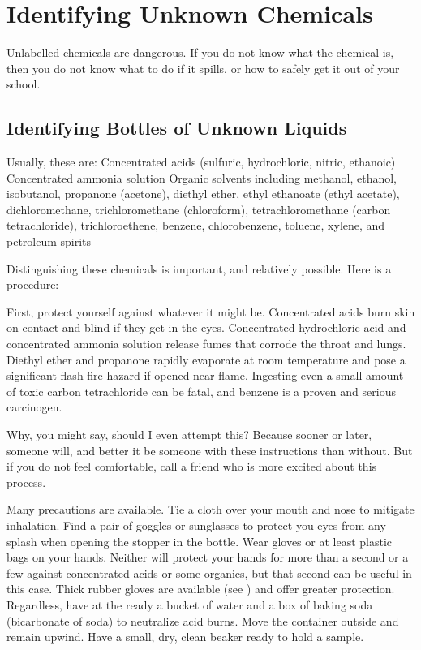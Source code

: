 \chapter{Identifying Unknown Chemicals}
\label{cha:unknownchemicals}
Unlabelled chemicals are dangerous. 
If you do not know what the chemical is, 
then you do not know what to do if it spills, 
or how to safely get it out of your school.

\section{Identifying Bottles of Unknown Liquids}

Usually, 
these are:
Concentrated acids (sulfuric, 
hydrochloric, 
nitric, 
ethanoic)
Concentrated ammonia solution
Organic solvents including methanol, 
ethanol, 
isobutanol, 
propanone (acetone), 
diethyl ether, 
ethyl ethanoate (ethyl acetate), 
dichloromethane, 
trichloromethane (chloroform), 
tetrachloromethane (carbon tetrachloride), 
trichloroethene, 
benzene, 
chlorobenzene, 
toluene, 
xylene, 
and petroleum spirits

Distinguishing these chemicals is important, 
and relatively possible. 
Here is a procedure:

First, 
protect yourself against whatever it might be. 
Concentrated acids burn skin on contact and blind if they get in the eyes. 
Concentrated hydrochloric acid and concentrated ammonia solution 
release fumes that corrode the throat and lungs. 
Diethyl ether and propanone rapidly evaporate at room temperature 
and pose a significant flash fire hazard if opened near flame. 
Ingesting even a small amount of toxic carbon tetrachloride can be fatal, 
and benzene is a proven and serious carcinogen.

Why, 
you might say, 
should I even attempt this? Because sooner or later, 
someone will, 
and better it be someone with these instructions than without. 
But if you do not feel comfortable, 
call a friend who is more excited about this process.

Many precautions are available. 
Tie a cloth over your mouth and nose to mitigate inhalation. 
Find a pair of goggles or sunglasses to protect you eyes 
from any splash when opening the stopper in the bottle. 
Wear gloves or at least plastic bags on your hands. 
Neither will protect your hands for more than a second 
or a few against concentrated acids or some organics, 
but that second can be useful in this case. 
Thick rubber gloves are available (see ) 
and offer greater protection. 
Regardless, 
have at the ready a bucket of water and a box of baking soda 
(bicarbonate of soda) to neutralize acid burns. 
Move the container outside and remain upwind. 
Have a small, 
dry, 
clean beaker ready to hold a sample.

